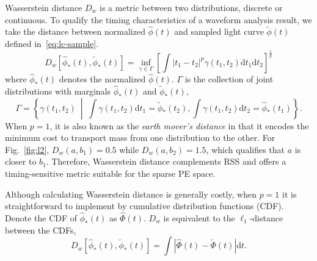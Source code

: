 Wasserstein distance $D_w$ is a metric between two distributions, discrete or continuous. To qualify the timing characteristics of a waveform analysis result, we take the distance between normalized $\hat{\phi}(t)$ and sampled light curve $\tilde{\phi}(t)$ defined in~\eqref{eq:lc-sample}.
\begin{equation}
  D_w\left[\hat{\phi}_*(t), \tilde{\phi}_*(t)\right] = \inf_{\gamma \in \Gamma} \left[\int \left\vert t_1 - t_2 \right\vert^p \gamma(t_1, t_2)\mathrm{d}t_1\mathrm{d}t_2\right]^{\frac{1}{p}}
\end{equation}
where $\hat{\phi}_*(t)$ denotes the normalized $\hat{\phi}(t)$. $\Gamma$ is the collection of joint distributions with marginals $\hat{\phi}_*(t)$ and $\tilde{\phi}_*(t)$,
\begin{equation*}
  \label{eq:joint}
  \Gamma = \left\{\gamma(t_1, t_2) ~\middle\vert~ \int\gamma(t_1,t_2)\mathrm{d}t_1 = \tilde{\phi}_*(t_2) , \int\gamma(t_1,t_2)\mathrm{d}t_2 = \hat{\phi}_*(t_1)  \right\}.
\end{equation*}
When $p=1$, it is also known as the \textit{earth mover's distance} in that it encodes the minimum cost to transport mass from one distribution to the other.
For Fig.~\ref{fig:l2}, $D_w(a, b_1) = 0.5$ while $D_w(a, b_2) = 1.5$, which qualifies that $a$ is closer to $b_1$.  Therefore, Wasserstein distance complements RSS and offers a timing-sensitive metric suitable for the sparse PE space.

Although calculating Wasserstein distance is generally costly, when $p=1$ it is straightforward to implement by cumulative distribution functions (CDF).  Denote the CDF of $\hat{\phi}_*(t)$ as $\hat\Phi(t)$.  $D_w$ is equivalent to the $\ell_1$-distance between the CDFs,
\begin{equation}
    D_w\left[\hat{\phi}_*(t), \tilde{\phi}_*(t)\right] = \int\left|\hat{\Phi}(t) - \tilde{\Phi}(t)\right| \mathrm{d}t.
    \label{eq:numerical}
\end{equation}
